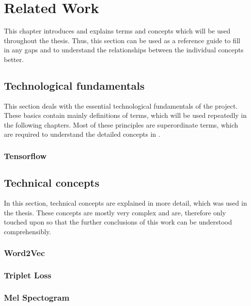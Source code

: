 \chapter{Related Work}
\label{ch:Related-Work}

This chapter introduces and explains terms and concepts which will be used throughout the thesis. Thus, this section can be used as a reference guide to fill in any gaps and to understand the relationships between the individual concepts better.

\section{Technological fundamentals}
\label{sec:Technological-Fundamentatls}

This section deals with the essential technological fundamentals of the project. These basics contain mainly definitions of terms, which will be used repeatedly in the following chapters. Most of these principles are superordinate terms, which are required to understand the detailed concepts in .

\subsection{Tensorflow}
\label{sub:Tensorflow}

\section{Technical concepts}
\label{sec:Technical-Concepts}

In this section, technical concepts are explained in more detail, which was used in the thesis. These concepts are mostly very complex and are, therefore only touched upon so that the further conclusions of this work can be understood comprehensibly.

\subsection{Word2Vec}
\label{sub:word2wec}

\subsection{Triplet Loss}
\label{sub:Triplet-Loss}

\subsection{Mel Spectogram}
\label{sub:Mel-Spectogram}

